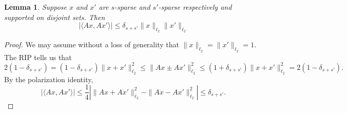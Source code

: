 \documentclass{article}
\newtheorem{lemma}[theorem]{Lemma}
\theoremstyle{definition}
\begin{document}
\begin{lemma}\label{lem:innner-control}
Suppose $x$ and $x'$ are $s$-sparse and $s'$-sparse respectively and supported on disjoint sets. Then
$$
|\langle Ax, Ax'\rangle| \leq \delta_{s + s'}\|x\|_{\ell_2}\|x'\|_{\ell_2}
$$
\end{lemma}
\begin{proof}
We may assume without a loss of generality that $\|x\|_{\ell_2} = \|x'\|_{\ell_2} = 1$. The RIP tells us that
$$
2(1 - \delta_{s + s'}) = (1 - \delta_{s + s'})\|x + x'\|_{\ell_2}^2 \leq \|Ax \pm Ax'\|_{\ell_2}^2 \leq (1 + \delta_{s + s'})\|x + x'\|_{\ell_2}^2 = 2(1 - \delta_{s+s'}).
$$
By the polarization identity,
$$
|\langle Ax, Ax'\rangle| \leq \frac{1}4\left|\|Ax + Ax'\|_{\ell_2}^2 - \|Ax - Ax'\|_{\ell_2}^2\right| \leq \delta_{s + s'}.
$$
\end{proof}
\end{document}
